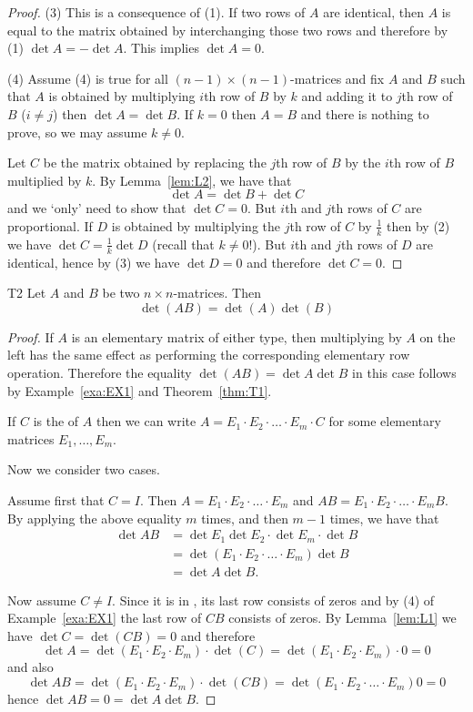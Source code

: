 \begin{proof}
(3) This is a consequence of (1). If two rows of $A$ are identical, then 
$A$ is equal to the matrix obtained by interchanging those two rows and 
therefore by (1) $\det A=-\det A$. This implies $\det A=0$. 

(4) Assume (4) is true for all $(n-1)\times (n-1)$-matrices
and fix $A$ and $B$ such that
 $A$ is obtained by multiplying $i$th row of $B$ by $k$ and adding it to 
$j$th row of $B$ ($i\neq j$) then $\det A=\det B$. 
If $k=0$ then $A=B$ and there is nothing to prove, so we may assume $k\neq 0$. 

Let $C$ be the matrix obtained by replacing the $j$th row of $B$ by the $i$th row of $B$ 
multiplied by $k$. 
By Lemma~\ref{lem:L2}, we have that 
\[
\det A=\det B+\det C
\]
and we `only' need to show that $\det C=0$. But $i$th and $j$th rows of $C$
are proportional. If $D$ is obtained by multiplying the $j$th row of $C$ by $\frac 1k$
then  by (2) we have $\det C=\frac 1k\det D$ (recall that $k\neq 0$!). 
But $i$th and $j$th rows of $D$ are identical, hence by (3) we have $\det D=0$
and therefore $\det C=0$. 
\end{proof} 

\begin{theorem}{}{T2}
Let $A$ and $B$ be two $n\times n$-matrices. Then
\begin{equation*}
\det (AB) =\det (A) \det (B)
\end{equation*}
\end{theorem}

\begin{proof} If $A$ is an elementary matrix of either type, then multiplying
by $A$ on the left has the same effect as performing the corresponding elementary 
row operation. Therefore the equality $\det (AB) =\det A\det B$  in this case follows by Example~\ref{exa:EX1} 
and Theorem~\ref{thm:T1}. 

If $C$ is the {\rref} of $A$ then we can write $A=E_1\cdot E_2\cdot\dots\cdot E_m\cdot C$
for some elementary matrices $E_1,\dots, E_m$. 

Now we consider two cases. 

Assume first that  $C=I$. Then $A=E_1\cdot E_2\cdot \dots\cdot E_m$ 
and $AB= E_1\cdot E_2\cdot \dots\cdot E_m B$. 
    By applying the above equality $m$ times, and then $m-1$ times,   
we have that 
\begin{align*}
\det AB&=\det E_1\det E_2\cdot \det E_m\cdot \det B\\
&=\det (E_1\cdot E_2\cdot\dots\cdot E_m) \det B\\
&=\det A\det B. 
\end{align*} 

Now assume $C\neq I$. Since it is in {\rref}, its last row consists of zeros 
and by (4) of Example~\ref{exa:EX1} the last row of $CB$ consists of zeros. 
By Lemma~\ref{lem:L1} we have $\det C=\det (CB)=0$ and therefore 
\[
\det A=\det (E_1\cdot E_2\cdot  E_m)\cdot  \det (C)
=
\det (E_1\cdot E_2\cdot  E_m)\cdot 0=0
\]
and also 
\[
\det AB=\det (E_1\cdot E_2\cdot  E_m)\cdot  \det (C B)
=\det (E_1\cdot E_2\cdot\dots\cdot E_m) 0
=0
\]
hence $\det AB=0=\det A \det B$. 
\end{proof} 

